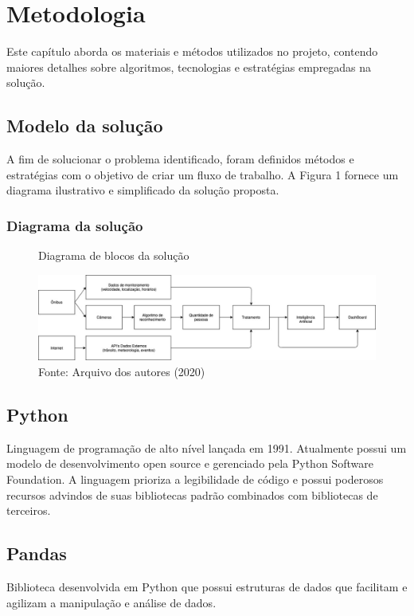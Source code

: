 \chapter{Metodologia}
\label{Cap:MateriaisMetodos}

\indent
\par Este capítulo aborda os materiais e métodos utilizados no projeto, contendo maiores detalhes sobre algoritmos, tecnologias e estratégias empregadas na solução.

\section{Modelo da solução}
\indent
\par A fim de solucionar o problema identificado, foram definidos métodos e estratégias com o objetivo de criar um fluxo de trabalho. A Figura 1 fornece um diagrama ilustrativo e simplificado da solução proposta.
\subsection{Diagrama da solução}

\begin{figure}[H]
    \centering
    \caption{Diagrama de blocos da solução}
    \includegraphics[width=1.0\linewidth]{Imagens/diagramaDeBlocos.jpg}
    \caption*{Fonte: Arquivo dos autores (2020)}
    \label{autoai-results}
\end{figure}

\section{Python}
\indent
\par Linguagem de programação de alto nível lançada em 1991. Atualmente possui um modelo de desenvolvimento open source e gerenciado pela Python Software Foundation. A linguagem prioriza a legibilidade de código e possui poderosos recursos advindos de suas bibliotecas padrão combinados com bibliotecas de terceiros.

\section{Pandas}
\indent
\par Biblioteca desenvolvida em Python que possui estruturas de dados que facilitam e agilizam a manipulação e análise de dados.


